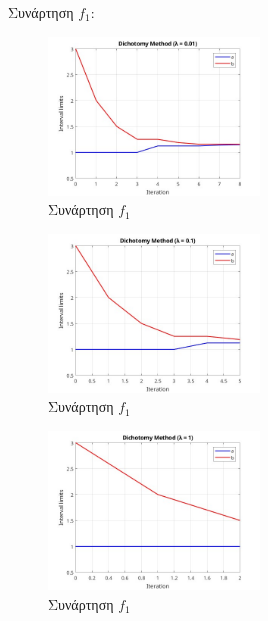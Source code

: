Συνάρτηση $f_1$:
\begin{figure}[H] %
    \centering
    \includegraphics[width=0.5\textwidth]{media/dichotomyf1_3001} %
    \caption{Συνάρτηση $f_1$}
\end{figure}
\begin{figure}[H] %
    \centering
    \includegraphics[width=0.5\textwidth]{media/dichotomyf1_301} %
    \caption{Συνάρτηση $f_1$}
\end{figure}
\begin{figure}[H] %
    \centering
    \includegraphics[width=0.5\textwidth]{media/dichotomyf1_31} %
    \caption{Συνάρτηση $f_1$}
\end{figure}

